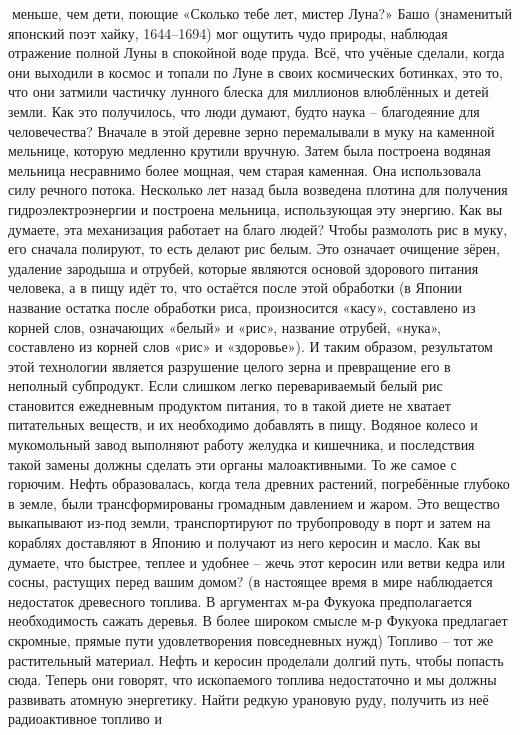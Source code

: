 \documentclass[a4paper]{book}
\begin{document}
меньше, чем дети, поющие «Сколько тебе лет, мистер Луна?» Башо (знаменитый японский
поэт хайку, 1644–1694) мог ощутить чудо природы, наблюдая отражение полной Луны в
спокойной воде пруда. Всё, что учёные сделали, когда они выходили в космос и топали по
Луне в своих космических ботинках, это то, что они затмили частичку лунного блеска для
миллионов влюблённых и детей земли.
Как это получилось, что люди думают, будто наука – благодеяние для человечества?
Вначале в этой деревне зерно перемалывали в муку на каменной мельнице, которую
медленно крутили вручную. Затем была построена водяная мельница несравнимо более
мощная, чем старая каменная. Она использовала силу речного потока. Несколько лет назад
была возведена плотина для получения гидроэлектроэнергии и построена мельница,
использующая эту энергию.
Как вы думаете, эта механизация работает на благо людей? Чтобы размолоть рис в муку,
его сначала полируют, то есть делают рис белым. Это означает очищение зёрен, удаление
зародыша и отрубей, которые являются основой здорового питания человека, а в пищу идёт
то, что остаётся после этой обработки (в Японии название остатка после обработки риса,
произносится «касу», составлено из корней слов, означающих «белый» и «рис», название
отрубей, «нука», составлено из корней слов «рис» и «здоровье»). И таким образом,
результатом этой технологии является разрушение целого зерна и превращение его в
неполный субпродукт. Если слишком легко перевариваемый белый рис становится
ежедневным продуктом питания, то в такой диете не хватает питательных веществ, и их
необходимо добавлять в пищу. Водяное колесо и мукомольный завод выполняют работу
желудка и кишечника, и последствия такой замены должны сделать эти органы
малоактивными.
То же самое с горючим. Нефть образовалась, когда тела древних растений, погребённые
глубоко в земле, были трансформированы громадным давлением и жаром. Это вещество
выкапывают из-под земли, транспортируют по трубопроводу в порт и затем на кораблях
доставляют в Японию и получают из него керосин и масло.
Как вы думаете, что быстрее, теплее и удобнее – жечь этот керосин или ветви кедра или
сосны, растущих перед вашим домом? (в настоящее время в мире наблюдается недостаток
древесного топлива. В аргументах м-ра Фукуока предполагается необходимость сажать
деревья. В более широком смысле м-р Фукуока предлагает скромные, прямые пути
удовлетворения повседневных нужд) Топливо – тот же растительный материал. Нефть и
керосин проделали долгий путь, чтобы попасть сюда.
Теперь они говорят, что ископаемого топлива недостаточно и мы должны развивать
атомную энергетику. Найти редкую урановую руду, получить из неё радиоактивное топливо и
\end{document}
